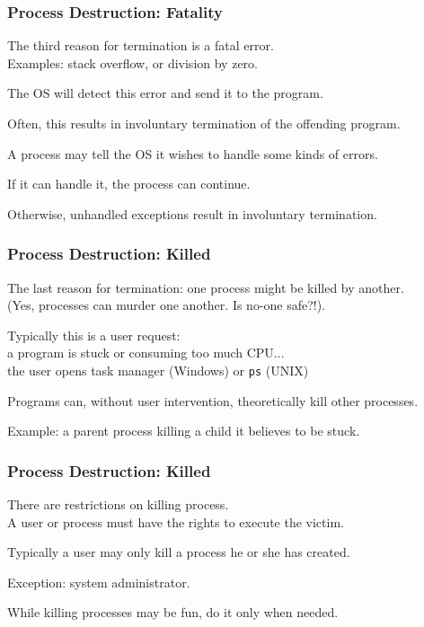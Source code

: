 \begin{frame}
	\frametitle{Process Destruction: Fatality}

	The third reason for termination is a fatal error.\\
	\quad Examples: stack overflow, or division by zero.

	The OS will detect this error and send it to the program.

	Often, this results in involuntary termination of the offending program.

	A process may tell the OS it wishes to handle some kinds of errors.

	If it can handle it, the process can continue.

	Otherwise, unhandled exceptions result in involuntary termination.

\end{frame}

\begin{frame}
	\frametitle{Process Destruction: Killed}

	The last reason for termination: one process might be killed by another.\\
	\quad (Yes, processes can murder one another. Is no-one safe?!).

	Typically this is a user request:\\
	\quad a program is stuck or consuming too much CPU...\\
	\quad the user opens task manager (Windows) or \texttt{ps} (UNIX)

	Programs can, without user intervention, theoretically kill other processes.

	Example: a parent process killing a child it believes to be stuck.

\end{frame}

\begin{frame}
	\frametitle{Process Destruction: Killed}

	There are restrictions on killing process.\\
	\quad A user or process must have the rights to execute the victim.

	Typically a user may only kill a process he or she has created.

	Exception: system administrator.

	While killing processes may be fun, do it only when needed.


\end{frame}


